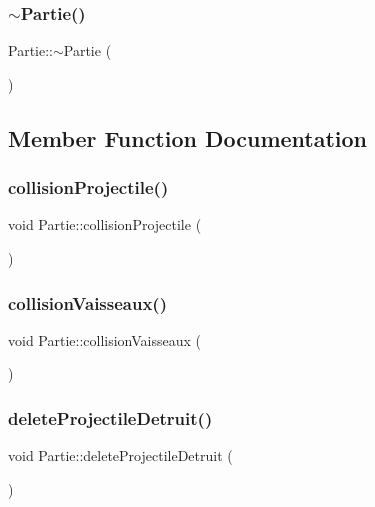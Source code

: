 \subsubsection{\texorpdfstring{$\sim$\+Partie()}{~Partie()}}
{\footnotesize\ttfamily Partie\+::$\sim$\+Partie (\begin{DoxyParamCaption}{ }\end{DoxyParamCaption})}



\subsection{Member Function Documentation}
\mbox{\label{class_partie_a2ed02302df62c0867ebec0fc83078da3}} 
\subsubsection{\texorpdfstring{collision\+Projectile()}{collisionProjectile()}}
{\footnotesize\ttfamily void Partie\+::collision\+Projectile (\begin{DoxyParamCaption}{ }\end{DoxyParamCaption})}

\mbox{\label{class_partie_a97ce349fac7e91f3cd8cc2a547a35239}} 
\subsubsection{\texorpdfstring{collision\+Vaisseaux()}{collisionVaisseaux()}}
{\footnotesize\ttfamily void Partie\+::collision\+Vaisseaux (\begin{DoxyParamCaption}{ }\end{DoxyParamCaption})}

\mbox{\label{class_partie_a88b2fa21d16b97fc120ea4d0e35208af}} 
\subsubsection{\texorpdfstring{delete\+Projectile\+Detruit()}{deleteProjectileDetruit()}}
{\footnotesize\ttfamily void Partie\+::delete\+Projectile\+Detruit (\begin{DoxyParamCaption}{ }\end{DoxyParamCaption})}

